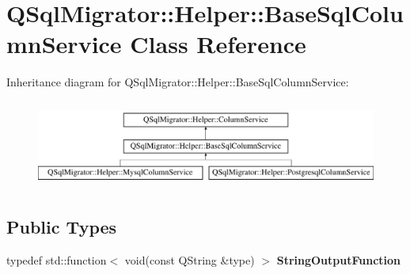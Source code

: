 \hypertarget{class_q_sql_migrator_1_1_helper_1_1_base_sql_column_service}{}\section{Q\+Sql\+Migrator\+:\+:Helper\+:\+:Base\+Sql\+Column\+Service Class Reference}
\label{class_q_sql_migrator_1_1_helper_1_1_base_sql_column_service}
Inheritance diagram for Q\+Sql\+Migrator\+:\+:Helper\+:\+:Base\+Sql\+Column\+Service\+:\begin{figure}[H]
\begin{center}
\leavevmode
\includegraphics[height=2.906574cm]{class_q_sql_migrator_1_1_helper_1_1_base_sql_column_service}
\end{center}
\end{figure}
\subsection*{Public Types}
\begin{DoxyCompactItemize}
\item 
\mbox{\label{class_q_sql_migrator_1_1_helper_1_1_base_sql_column_service_a9ef1b6bd6c0eaeb2ed998fc1313e07cc}} 
typedef std\+::function$<$ void(const Q\+String \&type) $>$ {\bfseries String\+Output\+Function}
\end{DoxyCompactItemize}
